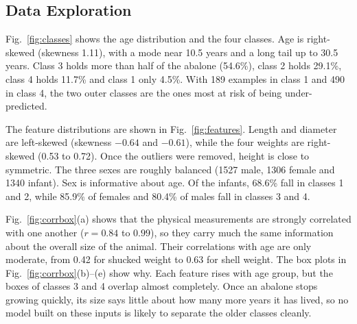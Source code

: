 \documentclass[conference]{IEEEtran}
\begin{document}
\subsection{Data Exploration}

Fig.~\ref{fig:classes} shows the age distribution and the four classes. Age is right-skewed (skewness 1.11), with a mode near 10.5 years and a long tail up to 30.5 years. Class 3 holds more than half of the abalone (54.6\%), class 2 holds 29.1\%, class 4 holds 11.7\% and class 1 only 4.5\%. With 189 examples in class 1 and 490 in class 4, the two outer classes are the ones most at risk of being under-predicted.

The feature distributions are shown in Fig.~\ref{fig:features}. Length and diameter are left-skewed (skewness $-0.64$ and $-0.61$), while the four weights are right-skewed (0.53 to 0.72). Once the outliers were removed, height is close to symmetric. The three sexes are roughly balanced (1527 male, 1306 female and 1340 infant). Sex is informative about age. Of the infants, 68.6\% fall in classes 1 and 2, while 85.9\% of females and 80.4\% of males fall in classes 3 and 4.

Fig.~\ref{fig:corrbox}(a) shows that the physical measurements are strongly correlated with one another ($r = 0.84$ to $0.99$), so they carry much the same information about the overall size of the animal. Their correlations with age are only moderate, from 0.42 for shucked weight to 0.63 for shell weight. The box plots in Fig.~\ref{fig:corrbox}(b)--(e) show why. Each feature rises with age group, but the boxes of classes 3 and 4 overlap almost completely. Once an abalone stops growing quickly, its size says little about how many more years it has lived, so no model built on these inputs is likely to separate the older classes cleanly.
\end{document}
